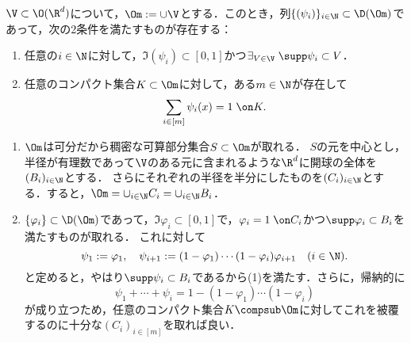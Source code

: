 \documentclass[uplatex,dvipdfmx]{jsreport}
\begin{document}
\begin{lemma}
    $\V\subset\O(\R^d)$について，$\Om:=\cup\V$とする．このとき，列$\{(\psi_i)\}_{i\in\N}\subset\D(\Om)$であって，次の2条件を満たすものが存在する：
    \begin{enumerate}
        \item 任意の$i\in\N$に対して，$\Im(\psi_i)\subset[0,1]$かつ$\exists_{V\in\V}\;\supp\psi_i\subset V$．
        \item 任意のコンパクト集合$K\subset\Om$に対して，ある$m\in\N$が存在して
        \[\sum_{i\in[m]}\psi_i(x)=1\;\on K.\]
    \end{enumerate}
\end{lemma}
\begin{Proof}\mbox{}
    \begin{enumerate}[{Step}1]
        \item $\Om$は可分だから稠密な可算部分集合$S\subset\Om$が取れる．
        $S$の元を中心とし，半径が有理数であって$\V$のある元に含まれるような$\R^d$に開球の全体を$(B_i)_{i\in\N}$とする．
        さらにそれぞれの半径を半分にしたものを$(C_i)_{i\in\N}$とする．すると，$\Om=\cup_{i\in\N}C_i=\cup_{i\in\N}B_i$．
        \item $\{\varphi_i\}\subset\D(\Om)$であって，$\Im\varphi_i\subset[0,1]$で，$\varphi_i=1\;\on C_i$かつ$\supp\varphi_i\subset B_i$を満たすものが取れる．
        これに対して
        \[\psi_1:=\varphi_1,\quad\psi_{i+1}:=(1-\varphi_1)\cdots(1-\varphi_i)\varphi_{i+1}\quad(i\in\N).\]
        と定めると，やはり$\supp\psi_i\subset B_i$であるから(1)を満たす．さらに，帰納的に
        \[\psi_1+\cdots+\psi_i=1-(1-\varphi_1)\cdots(1-\varphi_i)\]
        が成り立つため，任意のコンパクト集合$K\compsub\Om$に対してこれを被覆するのに十分な$(C_i)_{i\in[m]}$を取れば良い．
    \end{enumerate}
\end{Proof}
\end{document}
